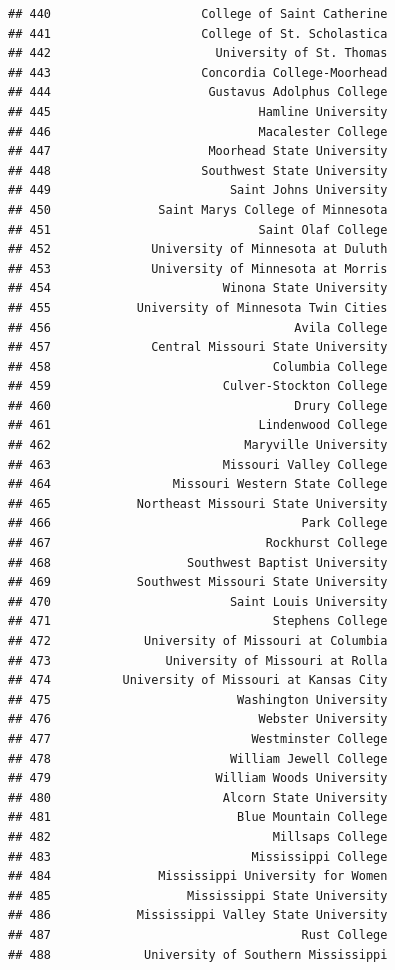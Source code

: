 \documentclass[]{article}
\begin{document}
\begin{verbatim}
## 440                     College of Saint Catherine
## 441                     College of St. Scholastica
## 442                       University of St. Thomas
## 443                     Concordia College-Moorhead
## 444                      Gustavus Adolphus College
## 445                             Hamline University
## 446                             Macalester College
## 447                      Moorhead State University
## 448                     Southwest State University
## 449                         Saint Johns University
## 450               Saint Marys College of Minnesota
## 451                             Saint Olaf College
## 452              University of Minnesota at Duluth
## 453              University of Minnesota at Morris
## 454                        Winona State University
## 455            University of Minnesota Twin Cities
## 456                                  Avila College
## 457              Central Missouri State University
## 458                               Columbia College
## 459                        Culver-Stockton College
## 460                                  Drury College
## 461                             Lindenwood College
## 462                           Maryville University
## 463                        Missouri Valley College
## 464                 Missouri Western State College
## 465            Northeast Missouri State University
## 466                                   Park College
## 467                              Rockhurst College
## 468                   Southwest Baptist University
## 469            Southwest Missouri State University
## 470                         Saint Louis University
## 471                               Stephens College
## 472             University of Missouri at Columbia
## 473                University of Missouri at Rolla
## 474          University of Missouri at Kansas City
## 475                          Washington University
## 476                             Webster University
## 477                            Westminster College
## 478                         William Jewell College
## 479                       William Woods University
## 480                        Alcorn State University
## 481                          Blue Mountain College
## 482                               Millsaps College
## 483                            Mississippi College
## 484               Mississippi University for Women
## 485                   Mississippi State University
## 486            Mississippi Valley State University
## 487                                   Rust College
## 488             University of Southern Mississippi

\end{verbatim}
\end{document}
